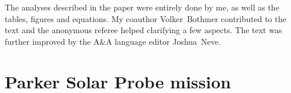 The analyses described in the paper were entirely done by me, as well as the tables, figures and equations. My coauthor Volker~Bothmer contributed to the text and the anonymous referee helped clarifying a few aspects. The text was further improved by the A\&A language editor Joshua~Neve.\\


\section{Parker Solar Probe mission}


